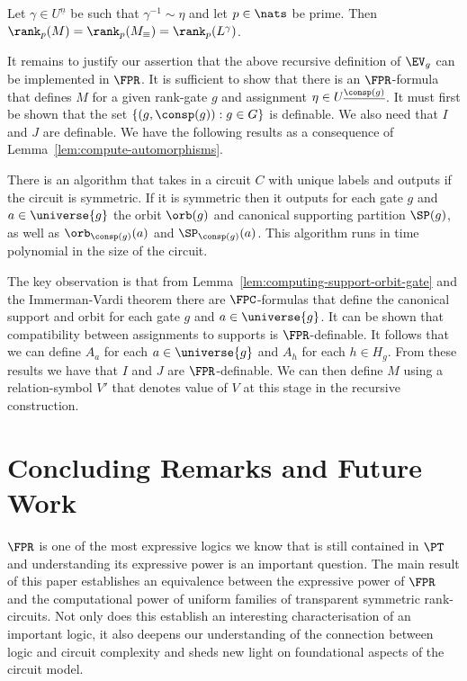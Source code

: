 \documentclass[a4paper,UKenglish]{lipics-v2018}
\begin{document}
\begin{lemma}
	Let $\gamma \in U^{\underline{n}}$ be such that $\gamma^{-1} \sim \eta$ and
  let $p \in \nats$ be prime. Then $\rank_p (M) = \rank_p (M_\equiv) = \rank_p
  (L^{\gamma})$.
  \label{lem:rank-triple-equivilence}
\end{lemma}

It remains to justify our assertion that the above recursive definition of
$\EV_g$ can be implemented in $\FPR$. It is sufficient to show that there is an
$\FPR$-formula that defines $M$ for a given rank-gate $g$ and assignment $\eta
\in U^{\underline{\consp(g)}}$. It must first be shown that the set $\{(g,
\consp(g)) : g \in G\}$ is definable. We also need that $I$ and $J$ are
definable. We have the following results as a consequence of
Lemma~\ref{lem:compute-automorphisms}.

\begin{lemma}
  There is an algorithm that takes in a circuit $C$ with unique labels and
  outputs if the circuit is symmetric. If it is symmetric then it outputs for
  each gate $g$ and $a \in \universe{g}$ the orbit $\orb(g)$ and canonical
  supporting partition $\SP(g)$, as well as $\orb_{\consp(g)}(a)$ and
  $\SP_{\consp(g)}(a)$. This algorithm runs in time polynomial in the size of
  the circuit.
  \label{lem:computing-support-orbit-gate}
\end{lemma}

The key observation is that from Lemma~\ref{lem:computing-support-orbit-gate}
and the Immerman-Vardi theorem there are $\FPC$-formulas that define the
canonical support and orbit for each gate $g$ and $a \in \universe{g}$. It can
be shown that compatibility between assignments to supports is $\FPR$-definable. It
follows that we can define $A_a$ for each $a \in \universe{g}$ and $A_h$ for
each $h \in H_g$. From these results we have that $I$ and $J$ are
$\FPR$-definable. We can then define $M$ using a relation-symbol $V'$ that
denotes value of $V$ at this stage in the recursive construction.

\section{Concluding Remarks and Future Work}
$\FPR$ is one of the most expressive logics we know that is still contained in
$\PT$ and understanding its expressive power is an important question. The main
result of this paper establishes an equivalence between the expressive power of
$\FPR$ and the computational power of uniform families of transparent symmetric
rank-circuits. Not only does this establish an interesting
characterisation of an important logic, it also deepens our understanding of
the connection between logic and circuit complexity and sheds new
light on foundational aspects of the circuit model.
\end{document}
